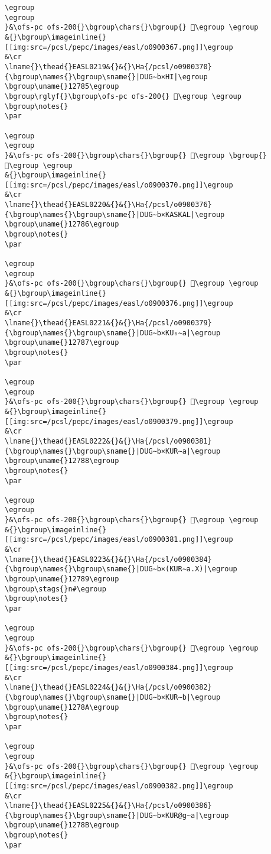 \begin{verbatim}
\egroup
\egroup
}&\ofs-pc ofs-200{}\bgroup\chars{}\bgroup{} 𒞄\egroup \egroup
&{}\bgroup\imageinline{}[[img:src=/pcsl/pepc/images/easl/o0900367.png]]\egroup
&\cr
\lname{}\thead{}EASL0219&{}&{}\Ha{/pcsl/o0900370}{\bgroup\names{}\bgroup\sname{}|DUG∼b×HI|\egroup
\bgroup\uname{}12785\egroup
\bgroup\rglyf{}\bgroup\ofs-pc ofs-200{} 𒞅\egroup \egroup
\bgroup\notes{}
\par 

\egroup
\egroup
}&\ofs-pc ofs-200{}\bgroup\chars{}\bgroup{} 𒞱\egroup \bgroup{} 𒞅\egroup \egroup
&{}\bgroup\imageinline{}[[img:src=/pcsl/pepc/images/easl/o0900370.png]]\egroup
&\cr
\lname{}\thead{}EASL0220&{}&{}\Ha{/pcsl/o0900376}{\bgroup\names{}\bgroup\sname{}|DUG∼b×KASKAL|\egroup
\bgroup\uname{}12786\egroup
\bgroup\notes{}
\par 

\egroup
\egroup
}&\ofs-pc ofs-200{}\bgroup\chars{}\bgroup{} 𒞆\egroup \egroup
&{}\bgroup\imageinline{}[[img:src=/pcsl/pepc/images/easl/o0900376.png]]\egroup
&\cr
\lname{}\thead{}EASL0221&{}&{}\Ha{/pcsl/o0900379}{\bgroup\names{}\bgroup\sname{}|DUG∼b×KU₆∼a|\egroup
\bgroup\uname{}12787\egroup
\bgroup\notes{}
\par 

\egroup
\egroup
}&\ofs-pc ofs-200{}\bgroup\chars{}\bgroup{} 𒞇\egroup \egroup
&{}\bgroup\imageinline{}[[img:src=/pcsl/pepc/images/easl/o0900379.png]]\egroup
&\cr
\lname{}\thead{}EASL0222&{}&{}\Ha{/pcsl/o0900381}{\bgroup\names{}\bgroup\sname{}|DUG∼b×KUR∼a|\egroup
\bgroup\uname{}12788\egroup
\bgroup\notes{}
\par 

\egroup
\egroup
}&\ofs-pc ofs-200{}\bgroup\chars{}\bgroup{} 𒞈\egroup \egroup
&{}\bgroup\imageinline{}[[img:src=/pcsl/pepc/images/easl/o0900381.png]]\egroup
&\cr
\lname{}\thead{}EASL0223&{}&{}\Ha{/pcsl/o0900384}{\bgroup\names{}\bgroup\sname{}|DUG∼b×(KUR∼a.X)|\egroup
\bgroup\uname{}12789\egroup
\bgroup\stags{}n#\egroup
\bgroup\notes{}
\par 

\egroup
\egroup
}&\ofs-pc ofs-200{}\bgroup\chars{}\bgroup{} 𒞉\egroup \egroup
&{}\bgroup\imageinline{}[[img:src=/pcsl/pepc/images/easl/o0900384.png]]\egroup
&\cr
\lname{}\thead{}EASL0224&{}&{}\Ha{/pcsl/o0900382}{\bgroup\names{}\bgroup\sname{}|DUG∼b×KUR∼b|\egroup
\bgroup\uname{}1278A\egroup
\bgroup\notes{}
\par 

\egroup
\egroup
}&\ofs-pc ofs-200{}\bgroup\chars{}\bgroup{} 𒞊\egroup \egroup
&{}\bgroup\imageinline{}[[img:src=/pcsl/pepc/images/easl/o0900382.png]]\egroup
&\cr
\lname{}\thead{}EASL0225&{}&{}\Ha{/pcsl/o0900386}{\bgroup\names{}\bgroup\sname{}|DUG∼b×KUR@g∼a|\egroup
\bgroup\uname{}1278B\egroup
\bgroup\notes{}
\par 


\end{verbatim}
